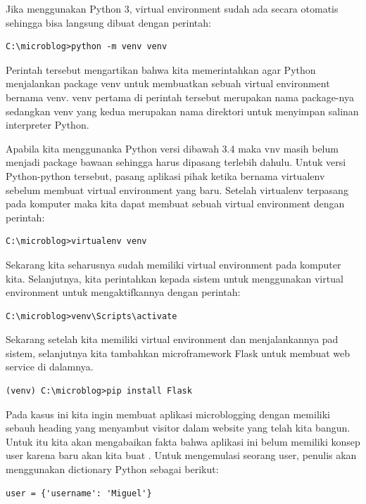 \documentclass[12pt]{article}
\begin{document}
Jika menggunakan Python 3, virtual environment sudah ada secara otomatis sehingga bisa langsung dibuat dengan perintah:

\begin{verbatim}
C:\microblog>python -m venv venv
\end{verbatim}

Perintah tersebut mengartikan bahwa kita memerintahkan agar Python menjalankan package venv untuk membuatkan sebuah virtual environment bernama venv. venv pertama di perintah tersebut merupakan nama package-nya sedangkan venv yang kedua merupakan nama direktori untuk menyimpan salinan interpreter Python.

Apabila kita menggunanka Python versi dibawah 3.4 maka vnv masih belum menjadi package bawaan sehingga harus dipasang terlebih dahulu. Untuk versi Python-python tersebut, pasang aplikasi pihak ketika bernama virtualenv sebelum membuat virtual environment yang baru. Setelah virtualenv terpasang pada komputer maka kita dapat membuat sebuah virtual environment dengan perintah:

\begin{verbatim}
C:\microblog>virtualenv venv
\end{verbatim}

Sekarang kita seharusnya sudah memiliki virtual environment pada komputer kita. Selanjutnya, kita perintahkan kepada sistem untuk menggunakan virtual environment untuk mengaktifkannya dengan perintah:

\begin{verbatim}
C:\microblog>venv\Scripts\activate

\end{verbatim}

Sekarang setelah kita memiliki virtual environment dan menjalankannya pad sistem, selanjutnya kita tambahkan microframework Flask untuk membuat web service di dalamnya.

\begin{verbatim}
(venv) C:\microblog>pip install Flask
\end{verbatim}

Pada kasus ini kita ingin membuat aplikasi microblogging dengan memiliki sebauh heading yang menyambut visitor dalam website yang telah kita bangun. Untuk itu kita akan mengabaikan fakta bahwa aplikasi ini belum memiliki konsep user karena baru akan kita buat . Untuk mengemulasi seorang user, penulis akan menggunakan dictionary Python sebagai berikut:

\begin{verbatim}
user = {'username': 'Miguel'}
\end{verbatim}
\end{document}
